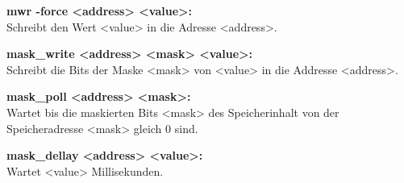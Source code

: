 \textbf{mwr -force <address> <value>: }\\
Schreibt den Wert <value> in die Adresse <address>.

\textbf{mask\_write <address> <mask> <value>: }\\
Schreibt die Bits der Maske <mask> von <value> in die Addresse <address>.

\textbf{mask\_poll <address> <mask>:  }\\
Wartet bis die maskierten Bits <mask> des Speicherinhalt von der Speicheradresse <mask> gleich 0 sind.

\textbf{mask\_dellay <address> <value>:}\\
Wartet <value> Millisekunden.



